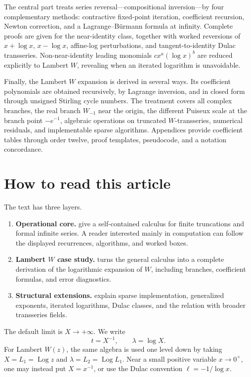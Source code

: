 \documentclass[11pt,openany]{book}
\theoremstyle{definition}
\theoremstyle{plain}
\theoremstyle{remark}
\DeclareMathOperator{\Log}{Log}
\begin{document}
The central part treats series reversal---compositional inversion---by four complementary methods: contractive fixed-point iteration, coefficient recursion, Newton correction, and a Lagrange--B\"urmann formula at infinity. Complete proofs are given for the near-identity class, together with worked reversions of \(x+\log x\), \(x-\log x\), affine-log perturbations, and tangent-to-identity Dulac transseries. Non-near-identity leading monomials \(cx^a(\log x)^b\) are reduced explicitly to Lambert \(W\), revealing when an iterated logarithm is unavoidable.

Finally, the Lambert \(W\) expansion is derived in several ways. Its coefficient polynomials are obtained recursively, by Lagrange inversion, and in closed form through unsigned Stirling cycle numbers. The treatment covers all complex branches, the real branch \(W_{-1}\) near the origin, the different Puiseux scale at the branch point \(-e^{-1}\), algebraic operations on truncated \(W\)-transseries, numerical residuals, and implementable sparse algorithms. Appendices provide coefficient tables through order twelve, proof templates, pseudocode, and a notation concordance.

\chapter*{How to read this article}
The text has three layers.

\begin{enumerate}
\item \textbf{Operational core.}  give a self-contained calculus for finite truncations and formal infinite series. A reader interested mainly in computation can follow the displayed recurrences, algorithms, and worked boxes.
\item \textbf{Lambert \(W\) case study.}  turns the general calculus into a complete derivation of the logarithmic expansion of \(W\), including branches, coefficient formulas, and error diagnostics.
\item \textbf{Structural extensions.}  explain sparse implementation, generalized exponents, iterated logarithms, Dulac classes, and the relation with broader transseries fields.
\end{enumerate}

The default limit is \(X\to+\infty\). We write
\[
 t=X^{-1},\qquad \lambda=\log X.
\]
For Lambert \(W(z)\), the same algebra is used one level down by taking \(X=L_1=\Log z\) and \(\lambda=L_2=\Log L_1\). Near a small positive variable \(x\to0^+\), one may instead put \(X=x^{-1}\), or use the Dulac convention \(\ell=-1/\log x\).
\end{document}
